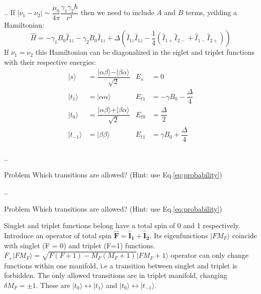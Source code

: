 \documentclass{beamer}
\begin{document}
\begin{frame}{\thesection.\thesubsection. \insertsubsection}
   If  $\mid \nu_1 -\nu_2 \mid \sim \dfrac{\mu_0}{4 \pi} \dfrac{\gamma_1 \gamma_2 \hbar}{r^3}$ then we need to include $A$ and $B$ terms, yeilding a Hamiltonian:
   \begin{equation}
     \hat{H} = -\gamma_1 B_0 \hat{I}_{1z} -\gamma_2 B_0 \hat{I}_{1z}  + \Delta ( \hat{I}_{1z} \hat{I}_{1z}  - \dfrac{1}{4} (\hat{I}_{1+} \hat{I}_{2-} + \hat{I}_{1-} \hat{I}_{2+} ) )  
   \end{equation}
   If $\nu_1 = \nu_2 $ this Hamiltonian can be diagonalized in the siglet and triplet functions with their respective energies:
   \begin{equation}
	   \begin{array}{clcl}	      
     	   \vert s \rangle &= \dfrac{\vert \alpha \beta \rangle - \vert  \beta \alpha \rangle}{\sqrt{2}} &  E_s &= 0 \\
	      \vert t_1 \rangle &=  \vert \alpha \alpha \rangle & E_{t1} &= -\gamma B_0 - \dfrac{\Delta}{4}\\
	      \vert t_0 \rangle &=  \dfrac{\vert \alpha \beta \rangle + \vert  \beta \alpha \rangle}{\sqrt{2}} & E_{t0} &= \dfrac{\Delta}{2} \\
	      \vert t_{-1} \rangle &= \vert \beta \beta \rangle	& E_{t1} &= \gamma B_0 + \dfrac{\Delta}{4}\\      
	   \end{array}   
   \end{equation}
\end{frame}

\begin{frame}{\thesection.\thesubsection. \insertsubsection}
    \begin{block}{Problem}
    	Which transitions are allowed? (Hint: use Eq.\ref{eq:probability})
    \end{block}    
\end{frame}

\begin{frame}{\thesection.\thesubsection. \insertsubsection}
	\begin{block}{Problem}
		Which transitions are allowed? (Hint: use Eq.\ref{eq:probability})
	\end{block}
	Singlet and triplet functions belong have a total spin of 0 and 1 respectively.  
	Introduce an operator of total spin $\bm{\hat{F}} = \bm{\hat{I}_{1}} + \bm{\hat{I}_2}$.  Its eigenfunctions $\vert F M_F \rangle$ coincide with singlet (F = 0) and triplet (F=1) functions. 
	$F_{+} \vert F M_F \rangle = \sqrt{F(F+1)-M_F(M_F+1)} \vert F M_F+1 \rangle$ operator can only change functions within one manifold, i.e a transition between singlet and triplet is forbidden.
	The only allowed transitions are in triplet manifold, changing $\delta M_F = \pm 1$. These are $\vert t_0 \rangle \leftrightarrow \vert t_1 \rangle$ and  $\vert t_0 \rangle \leftrightarrow \vert t_{-1} \rangle$.
\end{frame}
\end{document}
